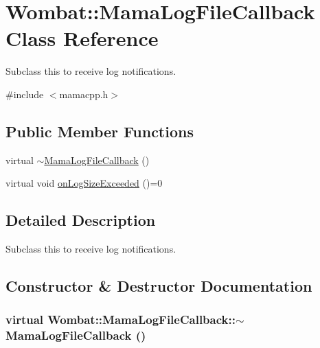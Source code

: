 \hypertarget{classWombat_1_1MamaLogFileCallback}{
\section{Wombat::MamaLogFileCallback Class Reference}
\label{classWombat_1_1MamaLogFileCallback}
}


Subclass this to receive log notifications.  


{\ttfamily \#include $<$mamacpp.h$>$}\subsection*{Public Member Functions}
\begin{DoxyCompactItemize}
\item 
virtual \hyperlink{classWombat_1_1MamaLogFileCallback_a1e66342eb7d12c3e4fcd6f4e4f8537ad}{$\sim$MamaLogFileCallback} ()
\item 
virtual void \hyperlink{classWombat_1_1MamaLogFileCallback_aeab41e1f482f6aa501d81eff1733137f}{onLogSizeExceeded} ()=0
\end{DoxyCompactItemize}


\subsection{Detailed Description}
Subclass this to receive log notifications. 

\subsection{Constructor \& Destructor Documentation}
\hypertarget{classWombat_1_1MamaLogFileCallback_a1e66342eb7d12c3e4fcd6f4e4f8537ad}{
\subsubsection[{$\sim$MamaLogFileCallback}]{\setlength{\rightskip}{0pt plus 5cm}virtual Wombat::MamaLogFileCallback::$\sim$MamaLogFileCallback ()}}
\label{classWombat_1_1MamaLogFileCallback_a1e66342eb7d12c3e4fcd6f4e4f8537ad}


